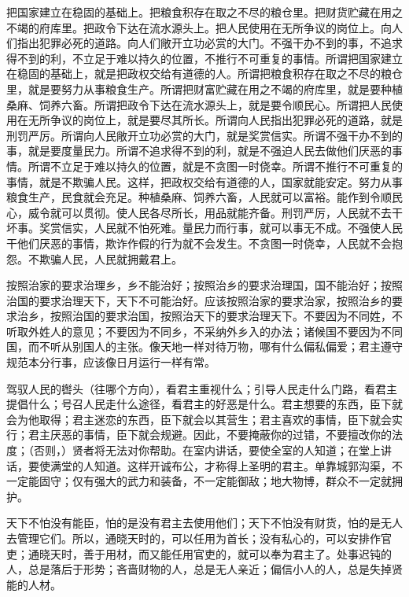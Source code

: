 \documentclass[12pt,UTF-8,openany]{ctexbook}
\begin{document}
\begin{normalsize}
    把国家建立在稳固的基础上。把粮食积存在取之不尽的粮仓里。把财货贮藏在用之不竭的府库里。把政令下达在流水源头上。把人民使用在无所争议的岗位上。向人们指出犯罪必死的道路。向人们敞开立功必赏的大门。不强干办不到的事，不追求得不到的利，不立足于难以持久的位置，不推行不可重复的事情。所谓把国家建立在稳固的基础上，就是把政权交给有道德的人。所谓把粮食积存在取之不尽的粮仓里，就是要努力从事粮食生产。所谓把财富贮藏在用之不竭的府库里，就是要种植桑麻、饲养六畜。所谓把政令下达在流水源头上，就是要令顺民心。所谓把人民使用在无所争议的岗位上，就是要尽其所长。所谓向人民指出犯罪必死的道路，就是刑罚严厉。所谓向人民敞开立功必赏的大门，就是奖赏信实。所谓不强干办不到的事，就是要度量民力。所谓不追求得不到的利，就是不强迫人民去做他们厌恶的事情。所谓不立足于难以持久的位置，就是不贪图一时侥幸。所谓不推行不可重复的事情，就是不欺骗人民。这样，把政权交给有道德的人，国家就能安定。努力从事粮食生产，民食就会充足。种植桑麻、饲养六畜，人民就可以富裕。能作到令顺民心，威令就可以贯彻。使人民各尽所长，用品就能齐备。刑罚严厉，人民就不去干坏事。奖赏信实，人民就不怕死难。量民力而行事，就可以事无不成。不强使人民干他们厌恶的事情，欺诈作假的行为就不会发生。不贪图一时侥幸，人民就不会抱怨。不欺骗人民，人民就拥戴君上。
    
    按照治家的要求治理乡，乡不能治好；按照治乡的要求治理国，国不能治好；按照治国的要求治理天下，天下不可能治好。应该按照治家的要求治家，按照治乡的要求治乡，按照治国的要求治国，按照治天下的要求治理天下。不要因为不同姓，不听取外姓人的意见；不要因为不同乡，不采纳外乡入的办法；诸候国不要因为不同国，而不听从别国人的主张。像天地一样对待万物，哪有什么偏私偏爱；君主遵守规范本分行事，应该像日月运行一样有常。
    
    驾驭人民的辔头（往哪个方向），看君主重视什么；引导人民走什么门路，看君主提倡什么；号召人民走什么途径，看君主的好恶是什么。君主想要的东西，臣下就会为他取得；君主迷恋的东西，臣下就会以其营生；君主喜欢的事情，臣下就会实行；君主厌恶的事情，臣下就会规避。因此，不要掩蔽你的过错，不要擅改你的法度；（否则，）贤者将无法对你帮助。在室内讲话，要使全室的人知道；在堂上讲话，要使满堂的人知道。这样开诚布公，才称得上圣明的君主。单靠城郭沟渠，不一定能固守；仅有强大的武力和装备，不一定能御敌；地大物博，群众不一定就拥护。
    
    天下不怕没有能臣，怕的是没有君主去使用他们；天下不怕没有财货，怕的是无人去管理它们。所以，通晓天时的，可以任用为首长；没有私心的，可以安排作官吏；通晓天时，善于用材，而又能任用官吏的，就可以奉为君主了。处事迟钝的人，总是落后于形势；吝啬财物的人，总是无人亲近；偏信小人的人，总是失掉贤能的人材。
    
\end{normalsize}
\end{document}
